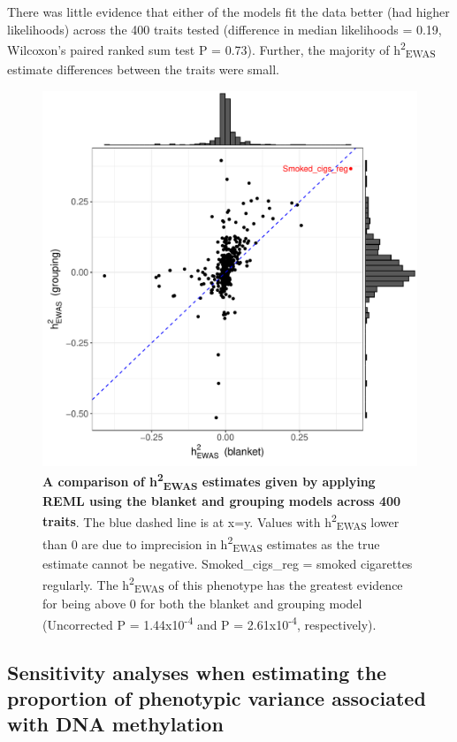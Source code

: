 \documentclass[11pt,oneside]{bristolthesis}
\begin{document}
There was little evidence that either of the models fit the data better (had higher likelihoods) across the 400 traits tested (difference in median likelihoods = 0.19, Wilcoxon's paired ranked sum test P = 0.73). Further, the majority of h\textsuperscript{2}\textsubscript{EWAS} estimate differences between the traits were small.




\begin{figure}

{\centering \includegraphics[width=1\linewidth]{figure/05-h2ewas/model_m2_comparison} 

}

\caption[A comparison of h\textsuperscript{2}\textsubscript{EWAS} estimates given by applying REML using the blanket and grouping models across 400 traits]{\textbf{A comparison of h\textsuperscript{2}\textsubscript{EWAS} estimates given by applying REML using the blanket and grouping models across 400 traits}. The blue dashed line is at x=y. Values with h\textsuperscript{2}\textsubscript{EWAS} lower than 0 are due to imprecision in h\textsuperscript{2}\textsubscript{EWAS} estimates as the true estimate cannot be negative. Smoked\_cigs\_reg = smoked cigarettes regularly. The h\textsuperscript{2}\textsubscript{EWAS} of this phenotype has the greatest evidence for being above 0 for both the blanket and grouping model (Uncorrected P = 1.44x10\textsuperscript{-4} and P = 2.61x10\textsuperscript{-4}, respectively).}\label{fig:h2ewas-estimates}
\end{figure}
\hypertarget{results-sensitivity-analyses-05}{%
\subsection{Sensitivity analyses when estimating the proportion of phenotypic variance associated with DNA methylation}\label{results-sensitivity-analyses-05}}
\end{document}
